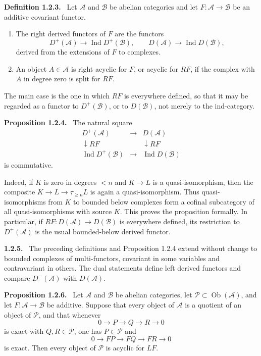 \documentclass[12pt]{article}
\newcommand{\A}{\mathcal{A}}
\newcommand{\B}{\mathcal{B}}
\newcommand{\Ob}{\operatorname{Ob}}
\newenvironment{statement}[1]{\par\medskip\noindent\textbf{#1.}\ }{\par\medskip}
\begin{document}
\begin{statement}{Definition 1.2.3}
Let \(\A\) and \(\B\) be abelian categories and let \(F:\A\to\B\) be an additive covariant functor.
\begin{enumerate}[label=(\roman*)]
\item The right derived functors of \(F\) are the functors
\[
D^+(\A)\to \operatorname{Ind}D^+(\B),
\qquad
D(\A)\to \operatorname{Ind}D(\B),
\]
derived from the extensions of \(F\) to complexes.
\item An object \(A\in\A\) is right acyclic for \(F\), or acyclic for \(RF\), if the complex with \(A\) in degree zero is split for \(RF\).
\end{enumerate}
\end{statement}

The main case is the one in which \(RF\) is everywhere defined, so that it may be regarded as a functor to \(D^+(\B)\), or to \(D(\B)\), not merely to the ind-category.

\begin{statement}{Proposition 1.2.4}
The natural square
\[
\begin{array}{ccc}
D^+(\A)&\longrightarrow&D(\A)\\
\downarrow RF&&\downarrow RF\\
\operatorname{Ind}D^+(\B)&\longrightarrow&\operatorname{Ind}D(\B)
\end{array}
\]
is commutative.
\end{statement}

Indeed, if \(K\) is zero in degrees \(<n\) and \(K\to L\) is a quasi-isomorphism, then the composite \(K\to L\to \tau_{\ge n}L\) is again a quasi-isomorphism. Thus quasi-isomorphisms from \(K\) to bounded below complexes form a cofinal subcategory of all quasi-isomorphisms with source \(K\). This proves the proposition formally. In particular, if \(RF:D(\A)\to D(\B)\) is everywhere defined, its restriction to \(D^+(\A)\) is the usual bounded-below derived functor.

\begin{statement}{1.2.5}
The preceding definitions and Proposition 1.2.4 extend without change to bounded complexes of multi-functors, covariant in some variables and contravariant in others. The dual statements define left derived functors and compare \(D^-(\A)\) with \(D(\A)\).
\end{statement}

\begin{statement}{Proposition 1.2.6}
Let \(\A\) and \(\B\) be abelian categories, let \(\mathcal P\subset\Ob(\A)\), and let \(F:\A\to\B\) be additive. Suppose that every object of \(\A\) is a quotient of an object of \(\mathcal P\), and that whenever
\[
0\to P\to Q\to R\to0
\]
is exact with \(Q,R\in\mathcal P\), one has \(P\in\mathcal P\) and
\[
0\to FP\to FQ\to FR\to0
\]
is exact. Then every object of \(\mathcal P\) is acyclic for \(LF\).
\end{statement}
\end{document}
